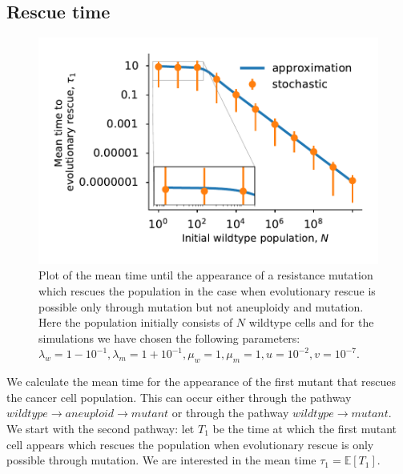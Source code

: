 \documentclass[12pt]{extarticle}
\begin{document}
\subsection*{Rescue time}
\begin{figure}[!t]
 \vspace*{1\baselineskip}
\includegraphics[width=1\textwidth]{Figures/MeanTimeGrowthMutantDirectPlot.pdf}
\caption{Plot of the mean time until the appearance of a resistance mutation which rescues the population in the case when evolutionary rescue is possible only through mutation but not aneuploidy and mutation.  Here the population initially consists of $N$ wildtype cells and for the simulations we have chosen the following parameters: $\lambda_w=1-10^{-1},\lambda_m=1+10^{-1},\mu_w=1,\mu_m=1,u=10^{-2},v=10^{-7}$.}
\label{MeanTimeGrowthAneuploidyPlot}
\end{figure}
We calculate the mean time for the appearance of the first mutant that rescues the cancer cell population. This can occur either through the pathway $wildtype\rightarrow aneuploid \rightarrow mutant$ or through the pathway $wildtype \rightarrow mutant$. We start with the second pathway: let $T_1$ be the time at which the first mutant cell appears which rescues the population when evolutionary rescue is only possible through mutation. We are interested in the mean time $\tau_1=\mathbb{E}\left[T_1\right]$.

\end{document}
